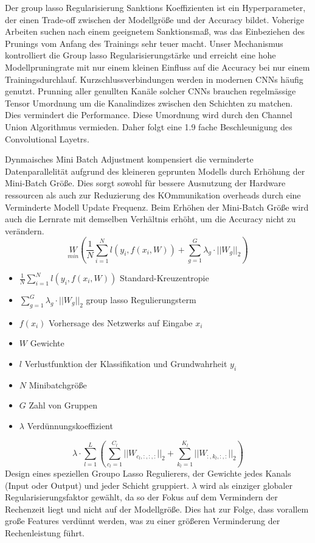 Der group lasso Regularisierung Sanktions Koeffizienten ist ein Hyperparameter, der einen Trade-off  zwischen der Modellgröße und der Accuracy bildet.
Voherige Arbeiten suchen nach einem geeignetem Sanktionsmaß, was das Einbeziehen des Prunings vom Anfang des Trainings sehr teuer macht.
Unser Mechanismus kontrolliert die Group lasso Regularisierungstärke und erreicht eine hohe Modellpruningrate mit nur einem kleinen Einfluss auf die Accuracy bei nur einem Trainingsdurchlauf.
Kurzschlussverbindungen werden in modernen CNNs häufig genutzt.
Prunning aller genullten Kanäle solcher CNNs brauchen regelmässige Tensor Umordnung um die Kanalindizes zwischen den Schichten zu matchen. Dies vermindert die Performance.
Diese Umordnung wird durch den Channel Union Algorithmus vermieden. Daher folgt eine 1.9 fache Beschleunigung des Convolutional Layetrs.

Dynmaisches Mini Batch Adjustment kompensiert die verminderte Datenparallelität aufgrund des kleineren geprunten Modells durch Erhöhung der Mini-Batch Größe.
Dies sorgt sowohl für bessere Ausnutzung der Hardware ressourcen als auch zur Reduzierung des KOmmunikation overheads durch eine Verminderte Modell Update Frequenz. Beim Erhöhen der Mini-Batch Größe wird auch die Lernrate mit demselben Verhältnis erhöht, um die Accuracy nicht zu verändern.
 $$ \underset{min}{W} \left( \frac{1}{N} \sum_{i=1}^{N} l(y_i,f(x_i, W)) + \sum_{g=1}^{G} \lambda_g \cdot || W_g ||_2 \right) $$
 \begin{itemize}
  \item $ \frac{1}{N} \sum_{i=1}^{N} l(y_i,f(x_i, W))$ Standard-Kreuzentropie
  \item $\sum_{g=1}^{G} \lambda_g \cdot || W_g ||_2 $ group lasso Regulierungsterm
  \item $f(x_i)$ Vorhersage des Netzwerks auf Eingabe $x_i$
  \item $W$ Gewichte
  \item $l$ Verlustfunktion der Klassifikation und Grundwahrheit $y_i$
  \item $N$ Minibatchgröße
  \item $G$ Zahl von Gruppen
  \item $\lambda$ Verdünnungskoeffizient
\end{itemize}

$$ \lambda \cdot \sum_{l=1}^{L} \left( \sum_{c_l=1}^{C_l} || W_{c_l,:,:,:} ||_2 + \sum_{k_l=1}^{K_l} || W_{:,k_l,:,:}||_2 \right) $$ 
Design eines speziellen Groupo Lasso Regulierers, der Gewichte jedes Kanals (Input oder Output) und jeder Schicht gruppiert. $\lambda$ wird als einziger globaler Regularisierungsfaktor gewählt, da so der Fokus auf dem Vermindern der Rechenzeit liegt und nicht auf der Modellgröße. Dies hat zur Folge, dass vorallem große Features verdünnt werden, was zu einer größeren Verminderung der Rechenleistung führt.

